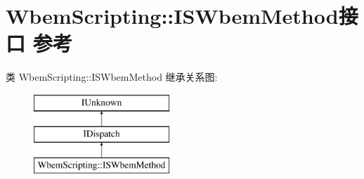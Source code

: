 \hypertarget{interface_wbem_scripting_1_1_i_s_wbem_method}{}\section{Wbem\+Scripting\+:\+:I\+S\+Wbem\+Method接口 参考}
\label{interface_wbem_scripting_1_1_i_s_wbem_method}
类 Wbem\+Scripting\+:\+:I\+S\+Wbem\+Method 继承关系图\+:\begin{figure}[H]
\begin{center}
\leavevmode
\includegraphics[height=3.000000cm]{interface_wbem_scripting_1_1_i_s_wbem_method}
\end{center}
\end{figure}
